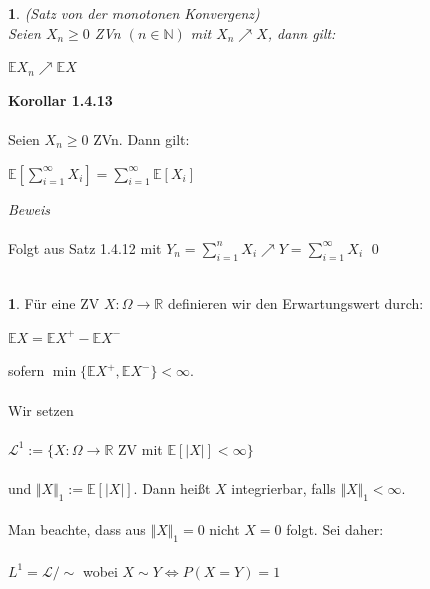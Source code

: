 \documentclass[10pt,a4paper]{report}
\numberwithin{equation}{section}
\numberwithin{figure}{section}
\theoremstyle{plain}
\theoremstyle{definition}
\newtheorem{defn}{\protect\definitionname}[section]
\theoremstyle{plain}
\newtheorem{prop}{\protect\propositionname}[section]
\theoremstyle{definition}
\theoremstyle{remark}
\theoremstyle{plain}
\theoremstyle{plain}
\theoremstyle{plain}
\theoremstyle{plain}
\theoremstyle{plain}
\providecommand{\definitionname}{Definition}
\providecommand{\propositionname}{Satz}
\newcommand{\1}{ \mathbb{1} } %
\begin{document}
\begin{prop}
  (Satz von der monotonen Konvergenz)\\
  Seien $X_n\geq 0$ ZVn $(n \in \mathbb{N})$ mit $X_n \nearrow X$,
  dann gilt:
  \begin{center}
    $\mathbb{E}X_n \nearrow \mathbb{E}X$
  \end{center}
\end{prop}
\textbf{Korollar 1.4.13}\\\\
Seien $X_n \geq 0$ ZVn. Dann gilt:
\begin{center}
$\mathbb{E}[\sum\limits_{i=1}^\infty X_i]=\sum\limits_{i=1}^\infty\mathbb{E}[X_i]$
\end{center}
\textit{Beweis}\\\\
Folgt aus Satz 1.4.12 mit $Y_n=\sum\limits_{i=1}^nX_i \nearrow Y= \sum\limits_{i=1}^\infty X_i$ \qed\\\\
\begin{defn}
  Für eine ZV $X:\Omega \to \mathbb{R}$ definieren wir den
  Erwartungswert durch:
  \begin{center}
    $\mathbb{E}X=\mathbb{E}X^+-\mathbb{E}X^-$
  \end{center}
  sofern $\min\{\mathbb{E}X^+,\mathbb{E}X^-\}<\infty$.\\\\
  Wir setzen\\\\
  $\mathcal{L}^1:=\{X:\Omega \to \mathbb{R}$ ZV mit $\mathbb{E}[|X|]< \infty \}$\\\\
  und $\Vert X\Vert_1:=\mathbb{E}[|X|]$. Dann heißt $X$ integrierbar, falls $\Vert X \Vert_1 < \infty$.\\\\
  Man beachte, dass aus $\Vert X \Vert_1=0$ nicht $X=0$ folgt. Sei daher:\\\\
  $L^1=\mathcal{L}/\sim$ wobei $X\sim Y \Leftrightarrow P(X=Y)=1$\\\\
\end{defn}
\end{document}
